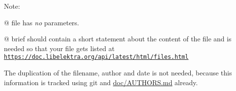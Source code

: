 Note\+:


\begin{DoxyItemize}
\item {\ttfamily @} {\ttfamily file} has {\itshape no} parameters.
\item {\ttfamily @} {\ttfamily brief} should contain a short statement about the content of the file and is needed so that your file gets listed at \href{https://doc.libelektra.org/api/latest/html/files.html}{\tt https\+://doc.\+libelektra.\+org/api/latest/html/files.\+html}
\end{DoxyItemize}

The duplication of the filename, author and date is not needed, because this information is tracked using git and \hyperlink{doc_AUTHORS_md}{doc/\+A\+U\+T\+H\+O\+RS.md} already. 